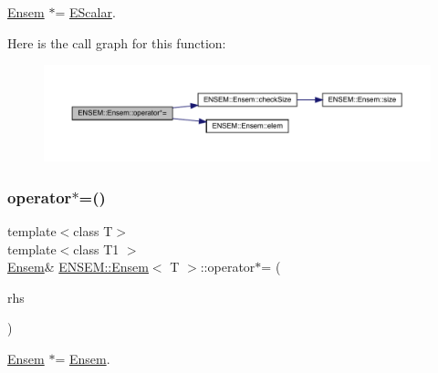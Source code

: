 \mbox{\hyperlink{classENSEM_1_1Ensem}{Ensem}} $\ast$= \mbox{\hyperlink{classENSEM_1_1EScalar}{E\+Scalar}}. 

Here is the call graph for this function\+:
\nopagebreak
\begin{figure}[H]
\begin{center}
\leavevmode
\includegraphics[width=350pt]{d7/d3e/classENSEM_1_1Ensem_abacb93dfca393ddb29f317d35e2fff7f_cgraph}
\end{center}
\end{figure}
\mbox{\label{classENSEM_1_1Ensem_ae6590e101b18547ec3d2682ecbea0371}} 
\subsubsection{\texorpdfstring{operator$\ast$=()}{operator*=()}\hspace{0.1cm}{\footnotesize\ttfamily [4/6]}}
{\footnotesize\ttfamily template$<$class T$>$ \\
template$<$class T1 $>$ \\
\mbox{\hyperlink{classENSEM_1_1Ensem}{Ensem}}\& \mbox{\hyperlink{classENSEM_1_1Ensem}{E\+N\+S\+E\+M\+::\+Ensem}}$<$ T $>$\+::operator$\ast$= (\begin{DoxyParamCaption}\item[{const \mbox{\hyperlink{classENSEM_1_1Ensem}{Ensem}}$<$ T1 $>$ \&}]{rhs }\end{DoxyParamCaption})\hspace{0.3cm}{\ttfamily [inline]}}



\mbox{\hyperlink{classENSEM_1_1Ensem}{Ensem}} $\ast$= \mbox{\hyperlink{classENSEM_1_1Ensem}{Ensem}}. 

